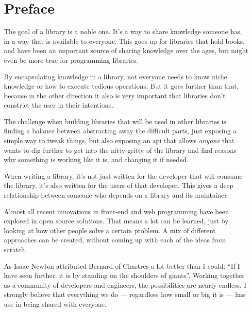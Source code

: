 
\chapter{Preface}%
\label{chp:preface}

The goal of a \gls{library} is a noble one. It's a way to share knowledge someone has, in a way that is available to everyone. This goes up for libraries that hold books, and have been an important source of sharing knowledge over the ages, but might even be more true for programming libraries. 

By encapsulating knowledge in a \gls{library}, not everyone needs to know niche knowledge or how to execute tedious operations. But it goes further than that, because in the other direction it also is very important that libraries don't constrict the user in their intentions.

The challenge when building libraries that will be used in other libraries is finding a balance between abstracting away the difficult parts, just exposing a simple way to tweak things, but also exposing an \acrshort{api} that allows \emph{anyone} that wants to dig further to get into the nitty-gritty of the \gls{library} and find reasons why something is working like it is, and changing it if needed.

When writing a \gls{library}, it's not just written for the developer that will consume the library, it's also written for the users of that developer. This gives a deep relationship between someone who depends on a \gls{library} and its maintainer.

Almost all recent innovations in front-end and web programming have been explored in open source solutions. That means a lot can be learned, just by looking at how other people solve a certain problem. A mix of different approaches can be created, without coming up with each of the ideas from scratch. 

As Isaac Newton\cite{newton-giants} attributed Bernard of Chartres\cite{quote-giants-source} a lot better than I could: ``If I have seen further, it is by standing on the shoulders of giants''. Working together as a community of developers and engineers, the possibilities are nearly endless. I strongly believe that everything we do --- regardless how small or big it is --- has use in being shared with everyone.
